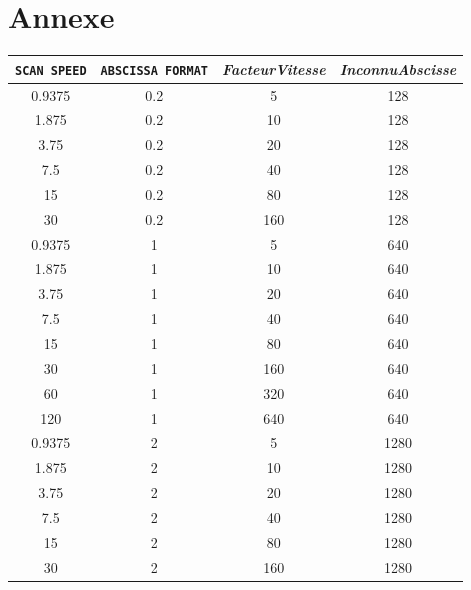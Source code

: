 \documentclass[a4paper, 12pt]{article}
\begin{document}
\newpage
\section{Annexe}\label{annexe}

		\begin{longtable}[c]{|c|c|c|c|}

\hline
\verb|SCAN SPEED| & \verb|ABSCISSA FORMAT| & \emph{FacteurVitesse} & \emph{InconnuAbscisse} \\ \hline
\endhead
%
0.9375     & 0.2             & 5              & 128     \\ \hline
1.875      & 0.2             & 10             & 128     \\ \hline
3.75       & 0.2             & 20             & 128     \\ \hline
7.5        & 0.2             & 40             & 128     \\ \hline
15         & 0.2             & 80             & 128     \\ \hline
30         & 0.2             & 160            & 128     \\ \hline
0.9375     & 1               & 5              & 640     \\ \hline
1.875      & 1               & 10             & 640     \\ \hline
3.75       & 1               & 20             & 640     \\ \hline
7.5        & 1               & 40             & 640     \\ \hline
15         & 1               & 80             & 640     \\ \hline
30         & 1               & 160            & 640     \\ \hline
60         & 1               & 320            & 640     \\ \hline
120        & 1               & 640            & 640     \\ \hline
0.9375     & 2               & 5              & 1280    \\ \hline
1.875      & 2               & 10             & 1280    \\ \hline
3.75       & 2               & 20             & 1280    \\ \hline
7.5        & 2               & 40             & 1280    \\ \hline
15         & 2               & 80             & 1280    \\ \hline
30         & 2               & 160            & 1280    \\ \hline

\end{longtable}
\end{document}
